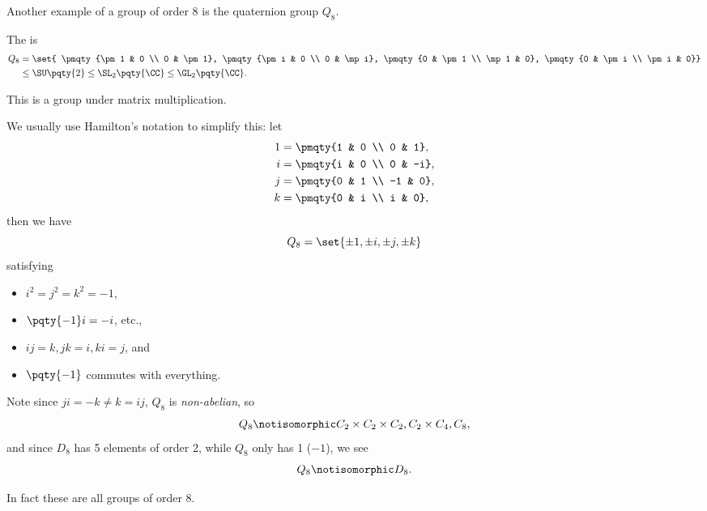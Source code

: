 Another example of a group of order 8 is the quaternion group \(Q_8\).

\begin{examples*}
    The  is
    \begin{align*}
        Q_8 &= \set{
            \pmqty{\pm 1 & 0 \\ 0 & \pm 1},
            \pmqty{\pm i & 0 \\ 0 & \mp i},
            \pmqty{0 & \pm 1 \\ \mp 1 & 0},
            \pmqty{0 & \pm i \\ \pm i & 0}} \\
        &\leq \SU\pqty{2} \leq \SL_2\pqty{\CC} \leq \GL_2\pqty{\CC}.
    \end{align*}

    This is a group under matrix multiplication.

    We usually use Hamilton's notation to simplify this: let
    \begin{align*}
        1 &= \pmqty{1 & 0 \\ 0 & 1}, \\
        i &= \pmqty{i & 0 \\ 0 & -i},\\
        j &= \pmqty{0 & 1 \\ -1 & 0},\\
        k &= \pmqty{0 & i \\ i & 0},
    \end{align*}
    then we have
    \[
        Q_8 = \set{\pm 1, \pm i, \pm j, \pm k}
    \]
    satisfying
    \begin{itemize}
        \item \(i^2 = j^2 = k^2 = -1\),
        \item \(\pqty{-1} i = -i\), etc.,
        \item \(ij = k, jk = i, ki = j\), and
        \item \(\pqty{-1}\) commutes with everything.
    \end{itemize}
\end{examples*}

Note since \(ji = -k \neq k = ij\), \(Q_8\) is \emph{non-abelian}, so
\[
    Q_8 \notisomorphic C_2 \times C_2 \times C_2, C_2 \times C_4, C_8,
\]
and since \(D_8\) has 5 elements of order 2, while \(Q_8\) only has 1 (\(-1\)), we see
\[
    Q_8 \notisomorphic D_8.
\]

In fact these are all groups of order 8.


